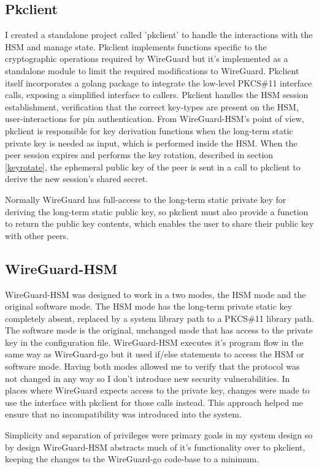 \documentclass [11pt, proquest] {uwthesis}[2020/02/24]
\begin{document}
\subsection{Pkclient}
\label{pk_design}
I created a standalone project called 'pkclient' to handle the interactions with the HSM and manage state. Pkclient implements functions specific to the cryptographic operations required by WireGuard but it's implemented as a standalone module to limit the required modifications to WireGuard. Pkclient itself incorporates a golang package to integrate the low-level PKCS\#11 interface calls, exposing a simplified interface to callers.  Pkclient handles the HSM session establishment, verification that the correct key-types are present on the HSM, user-interactions for pin authentication. 
From WireGuard-HSM's point of view, pkclient is responsible for key derivation functions when the long-term static private key is needed as input, which is performed inside the HSM. When the peer session expires and performs the key rotation, described in section \ref{keyrotate}, the ephemeral public key of the peer is sent in a call to pkclient to derive the new session's shared secret. 

Normally WireGuard has full-access to the long-term static private key for deriving the long-term static public key, so pkclient must also provide a function to return the public key contents, which enables the user to share their public key with other peers.


\subsection{WireGuard-HSM}
WireGuard-HSM was designed to work in a two modes, the HSM mode and the original software mode. The HSM mode has the long-term private static key completely absent, replaced by a system library path to a PKCS\#11 library path. The software mode is the original, unchanged mode that has access to the private key in the configuration file. WireGuard-HSM executes it's program flow in the same way as WireGuard-go but it used if/else statements to access the HSM or software mode. Having both modes allowed me to verify that the protocol was not changed in any way so I don't introduce new security vulnerabilities. In places where WireGuard expects access to the private key, changes were made to use the interface with pkclient for those calls instead. This approach helped me ensure that no incompatibility was introduced into the system. 

Simplicity and separation of privileges were primary goals in my system design so by design WireGuard-HSM abstracts much of it's functionality over to pkclient, keeping the changes to the WireGuard-go code-base to a minimum. 
\end{document}
